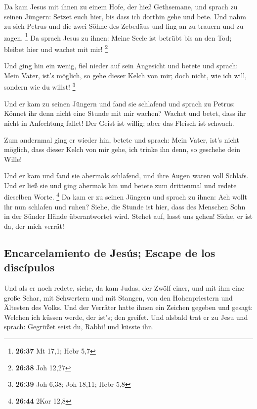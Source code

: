  Da kam Jesus mit ihnen zu einem Hofe, der hieß
Gethsemane, und sprach zu seinen Jüngern: Setzet euch hier, bis dass ich
dorthin gehe und bete.  Und nahm zu sich Petrus und die
zwei Söhne des Zebedäus und fing an zu trauern und zu zagen. \footnote{\textbf{26:37}
  Mt 17,1; Hebr 5,7}  Da sprach Jesus zu ihnen: Meine
Seele ist betrübt bis an den Tod; bleibet hier und wachet mit mir!
\footnote{\textbf{26:38} Joh 12,27}

 Und ging hin ein wenig, fiel nieder auf sein Angesicht
und betete und sprach: Mein Vater, ist's möglich, so gehe dieser Kelch
von mir; doch nicht, wie ich will, sondern wie du willst! \footnote{\textbf{26:39}
  Joh 6,38; Joh 18,11; Hebr 5,8}

 Und er kam zu seinen Jüngern und fand sie schlafend und
sprach zu Petrus: Könnet ihr denn nicht eine Stunde mit mir wachen?
 Wachet und betet, dass ihr nicht in Anfechtung fallet!
Der Geist ist willig; aber das Fleisch ist schwach.

 Zum andernmal ging er wieder hin, betete und sprach:
Mein Vater, ist's nicht möglich, dass dieser Kelch von mir gehe, ich
trinke ihn denn, so geschehe dein Wille!

 Und er kam und fand sie abermals schlafend, und ihre
Augen waren voll Schlafs.  Und er ließ sie und ging
abermals hin und betete zum drittenmal und redete dieselben Worte.
\footnote{\textbf{26:44} 2Kor 12,8}  Da kam er zu seinen
Jüngern und sprach zu ihnen: Ach wollt ihr nun schlafen und ruhen?
Siehe, die Stunde ist hier, dass des Menschen Sohn in der Sünder Hände
überantwortet wird.  Stehet auf, lasst uns gehen! Siehe,
er ist da, der mich verrät!

\hypertarget{encarcelamiento-de-jesuxfas-escape-de-los-discuxedpulos}{%
\subsection{Encarcelamiento de Jesús; Escape de los
discípulos}\label{encarcelamiento-de-jesuxfas-escape-de-los-discuxedpulos}}

 Und als er noch redete, siehe, da kam Judas, der Zwölf
einer, und mit ihm eine große Schar, mit Schwertern und mit Stangen, von
den Hohenpriestern und Ältesten des Volks.  Und der
Verräter hatte ihnen ein Zeichen gegeben und gesagt: Welchen ich küssen
werde, der ist's; den greifet.  Und alsbald trat er zu
Jesu und sprach: Gegrüßet seist du, Rabbi! und küsste ihn.

